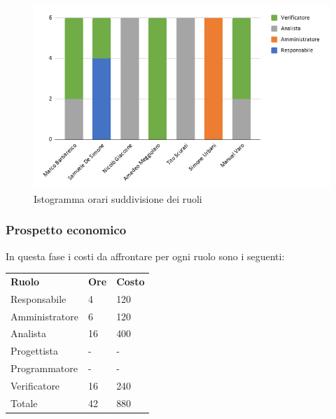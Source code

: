         \begin{figure}[!h]
            \caption{Istogramma orari suddivisione dei ruoli}
            \vspace{5px}
            \includegraphics[scale=0.6]{../../../Images/Diagrammi/Istogrammi/ore requisiti.png}
            \centering
        \end{figure}

    \subsubsection{Prospetto economico}
In questa fase i costi da affrontare per ogni ruolo sono i seguenti:
        \begin{center}
            \begin{table}[ht!]
                \centering
                \renewcommand{\arraystretch}{1.8}
                \begin{tabular}{p{75px} p{20px} p{30px}}
                    \rowcolor{logo!70} \textbf{Ruolo} & \textbf{Ore} & \textbf{Costo}\\
                    Responsabile & 4 & 120 \\
                    Amministratore & 6 & 120 \\
                    Analista & 16 & 400 \\
                    Progettista & - & - \\
                    Programmatore & - & - \\
                    Verificatore & 16 & 240  \\
                    Totale & 42 & 880 \\
                \end{tabular}
            \end{table}
        \end{center}
        \pagebreak

